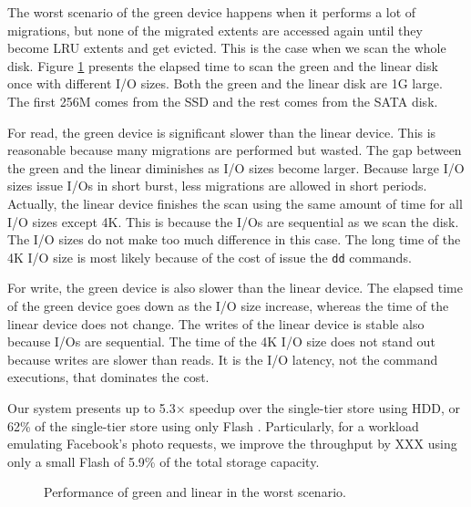 The worst scenario of the green device happens when it performs a lot
of migrations, but none of the migrated extents are accessed again
until they become LRU extents and get evicted. This is the case when
we scan the whole disk. Figure \ref{fig:worst} presents the elapsed
time to scan the green and the linear disk once with different I/O
sizes. Both the green and the linear disk are 1G large. The first 256M
comes from the SSD and the rest comes from the SATA disk.

For read, the green device is significant slower than the linear
device. This is reasonable because many migrations are performed but
wasted. The gap between the green and the linear diminishes as I/O
sizes become larger. Because large I/O sizes issue I/Os in short burst,
less migrations are allowed in short periods. Actually, the linear
device finishes the scan using the same amount of time for all I/O
sizes except 4K. This is because the I/Os are sequential as we scan
the disk. The I/O sizes do not make too much difference in this case.
The long time of the 4K I/O size is most likely because of the cost of
issue the \texttt{dd} commands. 

For write, the green device is also slower than the linear device. The
elapsed time of the green device goes down as the I/O size increase,
whereas the time of the linear device does not change. The writes of
the linear device is stable also because I/Os are sequential. The time
of the 4K I/O size does not stand out because writes are slower than
reads. It is the I/O latency, not the command executions, that
dominates the cost. 

Our system presents up to 5.3$\times$ speedup over the single-tier
store using HDD, or 62\% of the single-tier store using only Flash .
Particularly, for a workload emulating Facebook's photo requests, we
improve the throughput by XXX using only a small Flash of 5.9\% of the
total storage capacity.

\begin{figure}[t]
\begin{centering}
\caption{Performance of green and linear in the worst scenario. }
\label{fig:worst}
\end{centering}
\end{figure}



